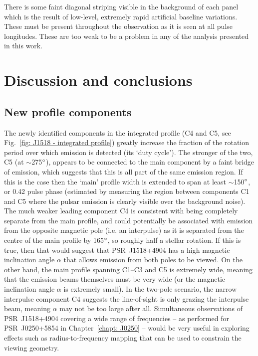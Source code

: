 There is some faint diagonal striping visible in the background of each panel which is the result of low-level, extremely rapid artificial baseline variations. These must be present throughout the observation as it is seen at all pulse longitudes. These are too weak to be a problem in any of the analysis presented in this work.




















\section{Discussion and conclusions}
\label{sec: J1518 - discussion}

\subsection{New profile components}
\label{sec: J1518 - discussion - new profile components}

The newly identified components in the integrated profile (C4 and C5, see Fig.~\ref{fig: J1518 - integrated profile}) greatly increase the fraction of the rotation period over which emission is detected (its `duty cycle'). The stronger of the two, C5 (at $\sim$275$^\circ$), appears to be connected to the main component by a faint bridge of emission, which suggests that this is all part of the same emission region. If this is the case then the `main' profile width is extended to span at least $\sim$150$^\circ$, or 0.42 pulse phase (estimated by measuring the region between components C1 and C5 where the pulsar emission is clearly visible over the background noise). The much weaker leading component C4 is consistent with being completely separate from the main profile, and could potentially be associated with emission from the opposite magnetic pole (i.e. an interpulse) as it is separated from the centre of the main profile by 165$^\circ$, so roughly half a stellar rotation. If this is true, then that would suggest that PSR~J1518+4904 has a high magnetic inclination angle $\alpha$ that allows emission from both poles to be viewed. On the other hand, the main profile spanning C1--C3 and C5 is extremely wide, meaning that the emission beams themselves must be very wide (or the magnetic inclination angle $\alpha$ is extremely small). In the two-pole scenario, the narrow interpulse component C4 suggests the line-of-sight is only grazing the interpulse beam, meaning $\alpha$ may not be too large after all. Simultaneous observations of PSR~J1518+4904 covering a wide range of frequencies -- as performed for PSR~J0250+5854 in Chapter~\ref{chapt: J0250} -- would be very useful in exploring effects such as radius-to-frequency mapping that can be used to constrain the viewing geometry.

